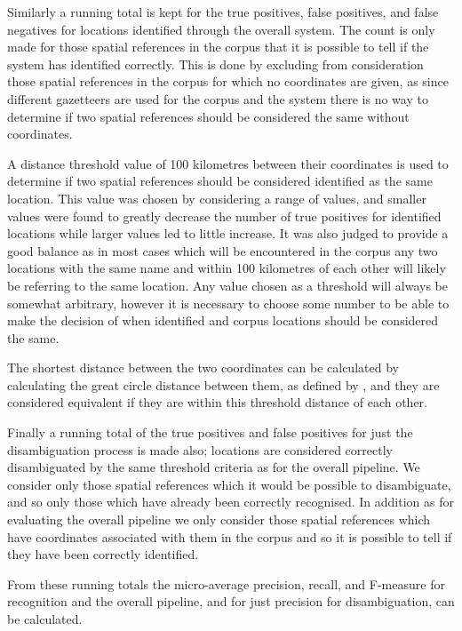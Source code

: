 \documentclass[12pt, a4paper]{report}
\begin{document}
Similarly a running total is kept for the true positives, false positives, and false negatives for locations identified through the overall system. The count is only made for those spatial references in the corpus that it is possible  to tell if the system has identified correctly. This is done by excluding from consideration those spatial references in the corpus for which no coordinates are given, as since different gazetteers are used for the corpus and the system there is no way to determine if two spatial references should be considered the same without coordinates.

A distance threshold value of 100 kilometres between their coordinates is used to determine if two spatial references should be considered identified as the same location. This value was chosen by considering a range of values, and smaller values were found to greatly decrease the number of true positives for identified locations while larger values led to little increase. It was also judged to provide a good balance as in most cases which will be encountered in the corpus any two locations with the same name and within 100 kilometres of each other will likely be referring to the same location. Any value chosen as a threshold will always be somewhat arbitrary, however it is necessary to choose some number to be able to make the decision of when identified and corpus locations should be considered the same.

The shortest distance between the two coordinates can be calculated by calculating the great circle distance between them, as defined by \citet{matuschek2014}, and they are considered equivalent if they are within this threshold distance of each other.

Finally a running total of the true positives and false positives for just the disambiguation process is made also; locations are considered correctly disambiguated by the same threshold criteria as for the overall pipeline. We consider only those spatial references which it would be possible to disambiguate, and so only those which have already been correctly recognised. In addition as for evaluating the overall pipeline we only consider those spatial references which have coordinates associated with them in the corpus and so it is possible to tell if they have been correctly identified.

From these running totals the micro-average precision, recall, and F-measure for recognition and the overall pipeline, and for just precision for disambiguation, can be calculated.
\end{document}
